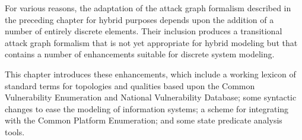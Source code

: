 For various reasons, the adaptation of the attack graph formalism described in
the preceding chapter for hybrid purposes depends upon the addition of a number
of entirely discrete elements. Their inclusion produces a transitional
attack graph formalism that is not yet appropriate for hybrid modeling but that
contains a number of enhancements suitable for discrete system modeling.

This chapter introduces these enhancements, which include a working lexicon of
standard terms for topologies and qualities based upon the Common Vulnerability
Enumeration and National Vulnerability Database; some syntactic
changes to ease the modeling of information systems; a scheme for integrating with
the Common Platform Enumeration; and some state predicate analysis tools.

